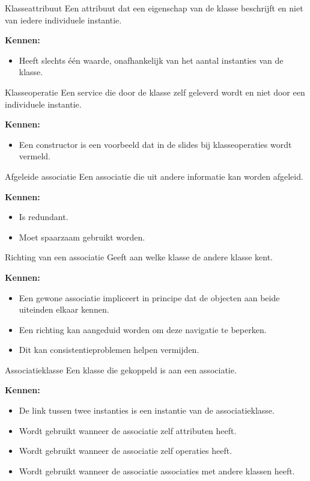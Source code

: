 \documentclass[11pt,a4paper]{article}
\begin{document}
\begin{definition}{Klasseattribuut}
Een attribuut dat een eigenschap van de klasse beschrijft en niet van iedere individuele instantie.

\textbf{Kennen:}
\begin{itemize}
    \item Heeft slechts één waarde, onafhankelijk van het aantal instanties van de klasse.
\end{itemize}
\end{definition}

\begin{definition}{Klasseoperatie}
Een service die door de klasse zelf geleverd wordt en niet door een individuele instantie.

\textbf{Kennen:}
\begin{itemize}
    \item Een constructor is een voorbeeld dat in de slides bij klasseoperaties wordt vermeld.
\end{itemize}
\end{definition}

\begin{definition}{Afgeleide associatie}
Een associatie die uit andere informatie kan worden afgeleid.

\textbf{Kennen:}
\begin{itemize}
    \item Is redundant.
    \item Moet spaarzaam gebruikt worden.
\end{itemize}
\end{definition}

\begin{definition}{Richting van een associatie}
Geeft aan welke klasse de andere klasse kent.

\textbf{Kennen:}
\begin{itemize}
    \item Een gewone associatie impliceert in principe dat de objecten aan beide uiteinden elkaar kennen.
    \item Een richting kan aangeduid worden om deze navigatie te beperken.
    \item Dit kan consistentieproblemen helpen vermijden.
\end{itemize}
\end{definition}

\begin{definition}{Associatieklasse}
Een klasse die gekoppeld is aan een associatie.

\textbf{Kennen:}
\begin{itemize}
    \item De link tussen twee instanties is een instantie van de associatieklasse.
    \item Wordt gebruikt wanneer de associatie zelf attributen heeft.
    \item Wordt gebruikt wanneer de associatie zelf operaties heeft.
    \item Wordt gebruikt wanneer de associatie associaties met andere klassen heeft.
\end{itemize}
\end{definition}
\end{document}
